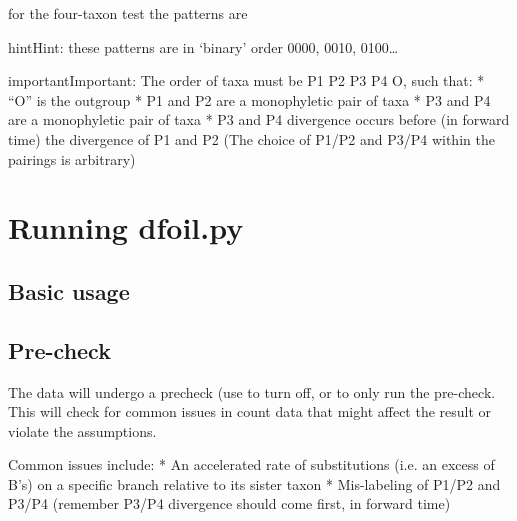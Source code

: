 \documentclass[letterpaper,12pt,english]{sphinxmanual}
\begin{document}

for the four-taxon test the patterns are

\begin{sphinxadmonition}{hint}{Hint:}
these patterns are in ‘binary’ order 0000, 0010, 0100…
\end{sphinxadmonition}

\begin{sphinxadmonition}{important}{Important:}
The order of taxa must be P1 P2 P3 P4 O, such that:
* “O” is the outgroup
* P1 and P2 are a monophyletic pair of taxa
* P3 and P4 are a monophyletic pair of taxa
* P3 and P4 divergence occurs before (in forward time) the divergence of P1 and P2
(The choice of P1/P2 and P3/P4 within the pairings is arbitrary)
\end{sphinxadmonition}


\section{Running dfoil.py}
\label{\detokenize{intro:running-dfoil-py}}

\subsection{Basic usage}
\label{\detokenize{intro:basic-usage}}


\subsection{Pre-check}
\label{\detokenize{intro:pre-check}}
The data will undergo a precheck (use  to turn off, or  to only run the pre-check.
This will check for common issues in count data that might affect the result or violate the assumptions.

Common issues include:
* An accelerated rate of substitutions (i.e. an excess of B’s) on a specific branch relative to its sister taxon
* Mis-labeling of P1/P2 and P3/P4 (remember P3/P4 divergence should come first, in forward time)
\end{document}

